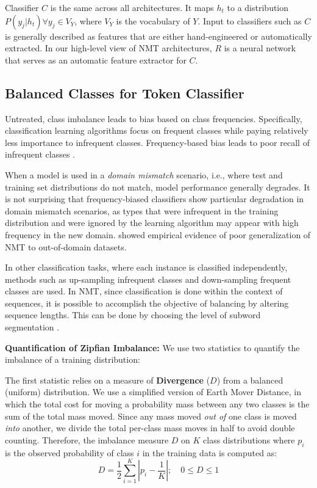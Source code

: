 Classifier $C$ is the same across all architectures.
It maps $h_t$ to a distribution $P(y_j | h_t) \forall y_j \in V_Y$, where $V_Y$ is the vocabulary of $Y$. 
Input to classifiers such as $C$ is generally described as features that are either hand-engineered or automatically extracted.
In our high-level view of NMT architectures, $R$ is a neural network that serves as an automatic feature extractor for $C$.

\subsection{Balanced Classes for Token Classifier}
\label{sec:classifier-balance}

Untreated, class imbalance leads to bias based on class frequencies.
Specifically, classification learning algorithms focus on frequent classes while paying relatively less importance to infrequent classes.
Frequency-based bias leads to poor recall of infrequent classes \cite{Johnson2019SurveyImbalance}. 

When a model is used in a \textit{domain mismatch} scenario, i.e., where test and training set distributions do not match, model performance generally degrades.
It is not surprising that frequency-biased classifiers show particular degradation in domain mismatch scenarios, as  types that were infrequent in the training distribution and were ignored by the learning algorithm may appear with high frequency in the new domain.
\citet{koehn2017sixchallenges} showed empirical evidence of poor generalization of NMT to out-of-domain datasets.

In other classification tasks, where each instance is classified independently, methods such as up-sampling infrequent classes and down-sampling frequent classes are used.
In NMT, since classification is done within the context of sequences, it is possible to accomplish the objective of balancing by altering sequence lengths.
This can be done by choosing the level of subword segmentation \cite{sennrich-etal-2016-bpe}.

\textbf{Quantification of Zipfian Imbalance:}
We use two statistics to quantify the imbalance of a training distribution:

The first statistic relies on a measure of \textbf{Divergence} ($D$) from a balanced (uniform) distribution. 
We use a simplified version of Earth Mover Distance, in which the total cost for moving a probability mass between any two classes  is the sum of the total mass moved.
Since any mass moved \textit{out of} one class is moved \textit{into} another, we divide the total per-class mass moves in half to avoid double counting.  
Therefore, the imbalance measure $D$ on $K$ class distributions where $p_i$ is the observed probability of class $i$ in the training data is computed as:
$$D = \frac{1}{2} \sum_{i=1}^{K}| p_i - \frac{1}{K}|; \quad 0 \le D \le 1 $$

